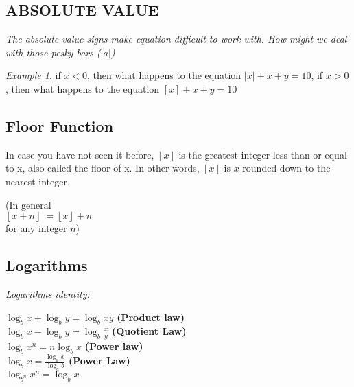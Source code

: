 \documentclass[10pt]{article}
\theoremstyle{remark}
\newtheorem*{example}{Example}
\begin{document}
\subsection{ABSOLUTE VALUE}
\textit{The absolute value signs make equation difficult to work with. How might we deal with those pesky bars ($|a|$)} \newline

\begin{example}
if $x < 0$, then what happens to the equation $|x| + x + y = 10$, if $x > 0$, then what happens to the equation $[x] + x + y = 10$
\end{example}

\begin{center}
\end{center}

\subsection{Floor Function}
In case you have not seen it before, $\left \lfloor x \right \rfloor$ is the greatest integer less than or equal to x, also called the floor of x. In other words, 
$\left \lfloor x \right \rfloor$ is $x$ rounded down to the nearest integer.
\begin{center}
(In general \\
	$\left \lfloor x + n \right \rfloor\ = \left \lfloor x \right \rfloor + n$ \\	
for any integer $n$)
\end{center}

\subsection{Logarithms}
\textit{Logarithms identity:}
\begin{center}
	$\log_{b}{x} + \log_{b}{y} = \log_{b}{xy}$ \textbf{(Product law)}\\
	$\log_{b}{x} - \log_{b}{y} = \log_{b}{\frac{x}{y}}$ \textbf{(Quotient Law)}\\
	$\log_{b}{x^n} = n\log_{b}{x}$ \textbf{(Power law)}\\
	$\log_b{x} = \frac{\log_a{x}}{\log_a{b}}$ \textbf{(Power Law)}\\
	$\log_{b^n}{x^n} = \log_{b}{x}$\\
\end{center}
\end{document}
